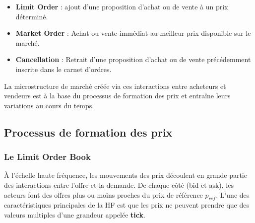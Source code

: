 \documentclass[12pt,a4paper]{article}
\theoremstyle{definition}
\theoremstyle{remark}
\begin{document}
    \begin{itemize}
        \item \textbf{Limit Order} : ajout d'une proposition d'achat ou de vente à un prix déterminé. 

        \item \textbf{Market Order} : Achat ou vente immédiat au meilleur prix disponible sur le marché. 

        \item \textbf{Cancellation} : Retrait d'une proposition d'achat ou de vente précédemment inscrite dans le carnet d'ordres.
    \end{itemize}

    La microstructure de marché créée via ces interactions entre acheteurs et vendeurs est à la base du processus de formation des prix et entraîne leurs variations au cours du temps.



    \subsection{Processus de formation des prix}
    \subsubsection{Le Limit Order Book}
    À l'échelle haute fréquence, les mouvements des prix découlent en grande partie des interactions entre l'offre et la demande. De chaque côté (bid et ask), les acteurs font des offres plus ou moins proches du prix de référence $p_{ref}$. L'une des caractéristiques principales de la HF est que les prix ne peuvent prendre que des valeurs multiples d'une grandeur appelée \textbf{tick}. 
    
\end{document}
